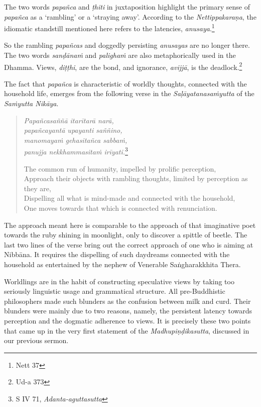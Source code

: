 The two words \emph{papañca} and \emph{ṭhiti} in juxtaposition highlight the primary sense of \emph{papañca} as a `rambling' or a `straying away'. According to the \emph{Nettippakaraṇa}, the idiomatic standstill mentioned here refers to the latencies, \emph{anusaya}.\footnote{Nett 37}

So the rambling \emph{papañcas} and doggedly persisting \emph{anusayas} are no longer there. The two words \emph{sanḍānaṁ} and \emph{palighaṁ} are also metaphorically used in the Dhamma. Views, \emph{diṭṭhi}, are the bond, and ignorance, \emph{avijjā}, is the deadlock.\footnote{Ud-a 373}

The fact that \emph{papañca} is characteristic of worldly thoughts, connected with the household life, emerges from the following verse in the \emph{Saḷāyatanasaṁyutta} of the \emph{Saṁyutta Nikāya}.

\clearpage

\begin{quote}
\emph{Papañcasaññā itarītarā narā,}\\
\emph{papañcayantā upayanti saññino,}\\
\emph{manomayaṁ gehasitañca sabbaṁ,}\\
\emph{panujja nekkhammasitaṁ irīyati.}\footnote{S IV 71, \emph{Adanta-aguttasutta}}

The common run of humanity, impelled by prolific perception,\\
Approach their objects with rambling thoughts, limited by perception as they are,\\
Dispelling all what is mind-made and connected with the household,\\
One moves towards that which is connected with renunciation.
\end{quote}

The approach meant here is comparable to the approach of that imaginative poet towards the ruby shining in moonlight, only to discover a spittle of beetle. The last two lines of the verse bring out the correct approach of one who is aiming at Nibbāna. It requires the dispelling of such daydreams connected with the household as entertained by the nephew of Venerable Saṅgharakkhita Thera.

Worldlings are in the habit of constructing speculative views by taking too seriously linguistic usage and grammatical structure. All pre-Buddhistic philosophers made such blunders as the confusion between milk and curd. Their blunders were mainly due to two reasons, namely, the persistent latency towards perception and the dogmatic adherence to views. It is precisely these two points that came up in the very first statement of the \emph{Madhupiṇḍikasutta}, discussed in our previous sermon.

